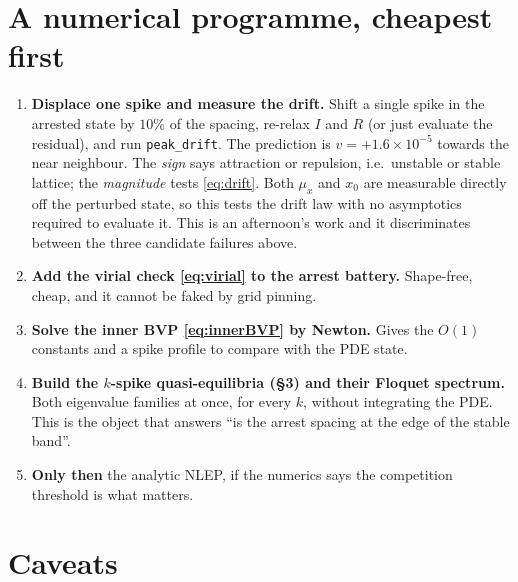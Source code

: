 \documentclass[11pt,a4paper]{article}
\theoremstyle{plain}
\theoremstyle{remark}
\begin{document}
\section{A numerical programme, cheapest first}

\begin{enumerate}
\item \textbf{Displace one spike and measure the drift.} Shift a single spike in
      the arrested state by $10\%$ of the spacing, re-relax $I$ and $R$ (or just
      evaluate the residual), and run \texttt{peak\_drift}. The prediction is
      $v = +1.6\times10^{-5}$ towards the near neighbour. The \emph{sign} says
      attraction or repulsion, i.e.\ unstable or stable lattice; the
      \emph{magnitude} tests \eqref{eq:drift}. Both $\mu_x$ and $x_0$ are
      measurable directly off the perturbed state, so this tests the drift law
      with no asymptotics required to evaluate it. This is an afternoon's work
      and it discriminates between the three candidate failures above.
\item \textbf{Add the virial check \eqref{eq:virial} to the arrest battery.}
      Shape-free, cheap, and it cannot be faked by grid pinning.
\item \textbf{Solve the inner BVP \eqref{eq:innerBVP} by Newton.} Gives the
      $O(1)$ constants and a spike profile to compare with the PDE state.
\item \textbf{Build the $k$-spike quasi-equilibria (\S3) and their Floquet
      spectrum.} Both eigenvalue families at once, for every $k$, without
      integrating the PDE. This is the object that answers ``is the arrest
      spacing at the edge of the stable band''.
\item \textbf{Only then} the analytic NLEP, if the numerics says the competition
      threshold is what matters.
\end{enumerate}

\section{Caveats}
\label{sec:caveats}
\end{document}
